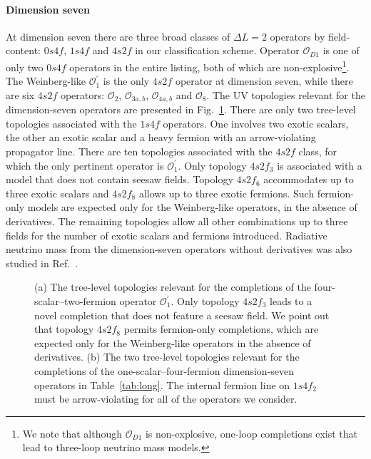 \paragraph{Dimension seven} At dimension seven there are three broad classes of
$\Delta L = 2$ operators by field-content: $0s4f$, $1s4f$ and $4s2f$ in our
classification scheme. Operator $\mathcal{O}_{D1}$ is one of only two $0s4f$
operators in the entire listing, both of which are non-explosive\footnote{We
  note that although $\mathcal{O}_{D1}$ is non-explosive, one-loop completions
  exist that lead to three-loop neutrino mass models.}. The Weinberg-like
$\mathcal{O}_{1}^{\prime}$ is the only $4s2f$ operator at dimension seven, while
there are six $4s2f$ operators: $\mathcal{O}_{2}$, $\mathcal{O}_{3a,b}$,
$\mathcal{O}_{4a,b}$ and $\mathcal{O}_{8}$. The UV topologies relevant for the
dimension-seven operators are presented in Fig.~\ref{fig:d7-topologies}. There
are only two tree-level topologies associated with the $1s4f$ operators. One
involves two exotic scalars, the other an exotic scalar and a heavy fermion with
an arrow-violating propagator line. There are ten topologies associated with the
$4s2f$ class, for which the only pertinent operator is
$\mathcal{O}_{1}^{\prime}$. Only topology $4s2f_{3}$ is associated with a model
that does not contain seesaw fields. Topology $4s2f_{6}$ accommodates up to
three exotic scalars and $4s2f_{8}$ allows up to three exotic fermions. Such
fermion-only models are expected only for the Weinberg-like operators, in the
absence of derivatives. The remaining topologies allow all other combinations up
to three fields for the number of exotic scalars and fermions introduced.
Radiative neutrino mass from the dimension-seven operators without derivatives
was also studied in Ref.~\cite{Cai:2014kra}.

\begin{figure}[t]
  \centering
  \caption{(a) The tree-level topologies relevant for the completions of the
    four-scalar--two-fermion operator $\mathcal{O}_{1}^{\prime}$. Only topology
    $4s2f_{3}$ leads to a novel completion that does not feature a seesaw field.
    We point out that topology $4s2f_{8}$ permits fermion-only completions,
    which are expected only for the Weinberg-like operators in the absence of
    derivatives. (b) The two tree-level topologies relevant for the completions
    of the one-scalar--four-fermion dimension-seven operators in
    Table~\ref{tab:long}. The internal fermion line on $1s4f_{2}$ must be
    arrow-violating for all of the operators we consider.}
  \label{fig:d7-topologies}
\end{figure}

